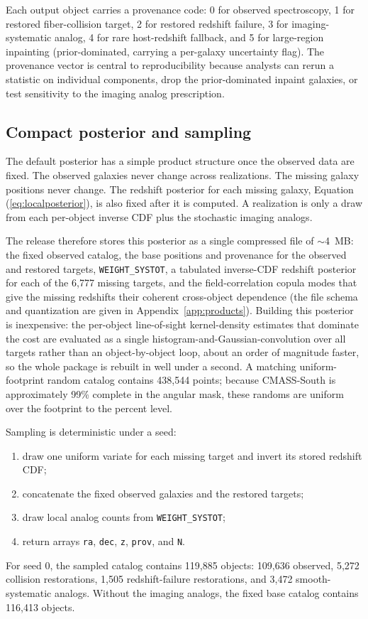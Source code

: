 \documentclass[apj]{emulateapj}
\begin{document}
Each output object carries a provenance code: 0 for observed spectroscopy,
1 for restored fiber-collision target, 2 for restored redshift failure, 3 for
imaging-systematic analog, 4 for rare host-redshift fallback, and 5 for
large-region inpainting (prior-dominated, carrying a per-galaxy uncertainty flag).
The provenance vector is central to reproducibility because analysts can rerun a
statistic on individual components, drop the prior-dominated inpaint galaxies, or
test sensitivity to the imaging analog prescription.

\subsection{Compact posterior and sampling}
\label{subsec:compact}

The default posterior has a simple product structure once the observed data are
fixed.  The observed galaxies never change across realizations.  The missing
galaxy positions never change.  The redshift posterior for each missing galaxy,
Equation (\ref{eq:localposterior}), is also fixed after it is computed.  A
realization is only a draw from each per-object inverse CDF plus the stochastic
imaging analogs.

The release therefore stores this posterior as a single compressed file of
$\sim$4~MB: the fixed observed catalog, the base positions and provenance for the
observed and restored targets, \texttt{WEIGHT\_SYSTOT}, a tabulated
inverse-CDF redshift posterior for each of the 6{,}777 missing targets, and the
field-correlation copula modes that give the missing redshifts their coherent
cross-object dependence (the file schema and quantization are given in
Appendix~\ref{app:products}).  Building this posterior is inexpensive: the
per-object line-of-sight kernel-density estimates that dominate the cost are
evaluated as a single histogram-and-Gaussian-convolution over all targets rather
than an object-by-object loop, about an order of magnitude faster, so the whole
package is rebuilt in well under a second.  A matching
uniform-footprint random catalog contains 438{,}544 points; because CMASS-South
is approximately 99\% complete in the angular mask, these randoms are uniform
over the footprint to the percent level.

Sampling is deterministic under a seed:
\begin{enumerate}
\item draw one uniform variate for each missing target and invert its stored
redshift CDF;
\item concatenate the fixed observed galaxies and the restored targets;
\item draw local analog counts from \texttt{WEIGHT\_SYSTOT};
\item return arrays \texttt{ra}, \texttt{dec}, \texttt{z}, \texttt{prov}, and
\texttt{N}.
\end{enumerate}
For seed 0, the sampled catalog contains 119,885 objects: 109,636 observed,
5,272 collision restorations, 1,505 redshift-failure restorations, and 3,472
smooth-systematic analogs.  Without the imaging analogs, the fixed base catalog
contains 116,413 objects.
\end{document}
